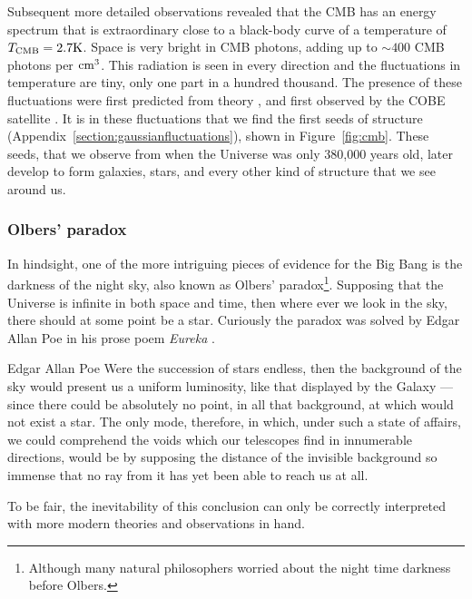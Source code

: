 Subsequent more detailed observations revealed that the \ac{CMB} has an energy spectrum that is extraordinary close to a black-body curve \citep{COBE-FIRAS-1994} of a temperature of $T_{\rm CMB} = 2.7 {\rm K}$. Space is very bright in \ac{CMB} photons, adding up to $\sim 400$ \ac{CMB} photons per ${\rm cm}^3$. This radiation is seen in every direction and the fluctuations in temperature are tiny, only one part in a hundred thousand. The presence of these fluctuations were first predicted from theory \citep{Harrison1970,Peebles1970,Zeldovich1972}, and first observed by the COBE satellite \citep{Smoot1992}. It is in these fluctuations that we find the first seeds of structure (Appendix~\ref{section:gaussianfluctuations}), shown in Figure~\ref{fig:cmb}. These seeds, that we observe from when the Universe was only 380,000 years old, later develop to form galaxies, stars, and every other kind of structure that we see around us.

\subsubsection{Olbers' paradox}
In hindsight, one of the more intriguing pieces of evidence for the Big Bang is the darkness of the night sky, also known as Olbers' paradox\footnote{Although many natural philosophers worried about the night time darkness before Olbers.}. Supposing that the Universe is infinite in both space and time, then where ever we look in the sky, there should at some point be a star. Curiously the paradox was solved by Edgar Allan Poe in his prose poem \emph{Eureka} \citep{Poe1848}.

\begin{aquote}{Edgar Allan Poe}
    Were the succession of stars endless, then the background of the sky would present us a uniform luminosity, like that displayed by the Galaxy --- since there could be absolutely no point, in all that background, at which would not exist a star. The only mode, therefore, in which, under such a state of affairs, we could comprehend the voids which our telescopes find in innumerable directions, would be by supposing the distance of the invisible background so immense that no ray from it has yet been able to reach us at all.
\end{aquote}

To be fair, the inevitability of this conclusion can only be correctly interpreted with more modern theories and observations in hand.


